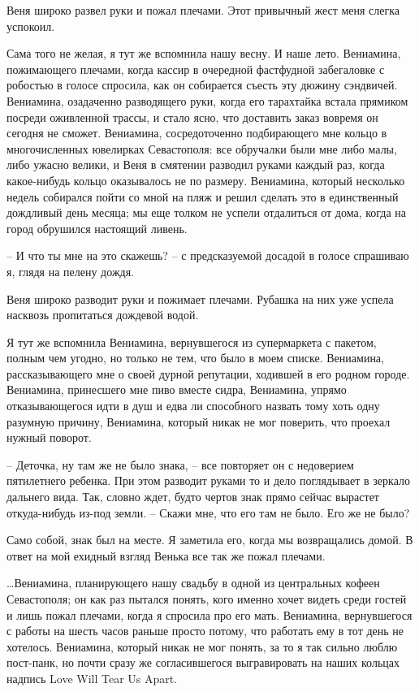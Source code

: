 \documentclass[
]{book}
\begin{document}
Веня широко развел руки и пожал плечами. Этот привычный жест меня слегка успокоил.

Сама того не желая, я тут же вспомнила нашу весну. И наше лето. Вениамина, пожимающего плечами, когда кассир в очередной фастфудной забегаловке с робостью в голосе спросила, как он собирается съесть эту дюжину сэндвичей. Вениамина, озадаченно разводящего руки, когда его тарахтайка встала прямиком посреди оживленной трассы, и стало ясно, что доставить заказ вовремя он сегодня не сможет. Вениамина, сосредоточенно подбирающего мне кольцо в многочисленных ювелирках Севастополя: все обручалки были мне либо малы, либо ужасно велики, и Веня в смятении разводил руками каждый раз, когда какое-нибудь кольцо оказывалось не по размеру. Вениамина, который несколько недель собирался пойти со мной на пляж и решил сделать это в единственный дождливый день месяца; мы еще толком не успели отдалиться от дома, когда на город обрушился настоящий ливень.

-- И что ты мне на это скажешь? -- с предсказуемой досадой в голосе спрашиваю я, глядя на пелену дождя.

Веня широко разводит руки и пожимает плечами. Рубашка на них уже успела насквозь пропитаться дождевой водой.

Я тут же вспомнила Вениамина, вернувшегося из супермаркета с пакетом, полным чем угодно, но только не тем, что было в моем списке. Вениамина, рассказывающего мне о своей дурной репутации, ходившей в его родном городе. Вениамина, принесшего мне пиво вместе сидра, Вениамина, упрямо отказывающегося идти в душ и едва ли способного назвать тому хоть одну разумную причину, Вениамина, который никак не мог поверить, что проехал нужный поворот.

-- Деточка, ну там же не было знака, -- все повторяет он с недоверием пятилетнего ребенка. При этом разводит руками то и дело поглядывает в зеркало дальнего вида. Так, словно ждет, будто чертов знак прямо сейчас вырастет откуда-нибудь из-под земли. -- Скажи мне, что его там не было. Его же не было?

Само собой, знак был на месте. Я заметила его, когда мы возвращались домой. В ответ на мой ехидный взгляд Венька все так же пожал плечами.

\ldots Вениамина, планирующего нашу свадьбу в одной из центральных кофеен Севастополя; он как раз пытался понять, кого именно хочет видеть среди гостей и лишь пожал плечами, когда я спросила про его мать. Вениамина, вернувшегося с работы на шесть часов раньше просто потому, что работать ему в тот день не хотелось. Вениамина, который никак не мог понять, за то я так сильно люблю пост-панк, но почти сразу же согласившегося выгравировать на наших кольцах надпись Love Will Tear Us Apart.
\end{document}
